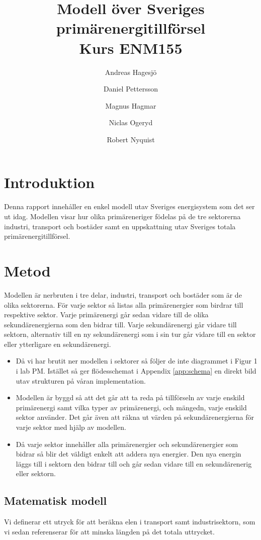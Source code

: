 \documentclass[a4paper,11pt,fleqn, titlepage]{article}
\author{Andreas Hagesjö \and Daniel Pettersson \and
Magnus Hagmar \and Niclas Ogeryd \and Robert Nyquist}
\title{Modell över Sveriges primärenergitillförsel \\ Kurs ENM155}
\begin{document}
\maketitle

\section{Introduktion}
Denna rapport innehåller en enkel modell utav Sveriges energisystem som det
ser ut idag. Modellen visar hur olika primäreneriger födelas på de tre
sektorerna industri, transport och bostäder samt en uppskattning utav
Sveriges totala primärenergitillförsel.


\section{Metod}
Modellen är nerbruten i tre delar, industri, transport och bostäder som är
de olika sektorerna. För varje sektor så listas alla primärenergier som
birdrar till respektive sektor. Varje primärenergi går sedan vidare till de
olika sekundärenergierna som den bidrar till. Varje sekundärenergi går
vidare till sektorn, alternativ till en ny sekundärenergi som i sin tur går
vidare till en sektor eller ytterligare en sekundärenergi.

\begin{itemize}
\item Då vi har brutit ner modellen i sektorer så följer de inte diagrammet
	i Figur 1 i lab PM. Istället så ger flödesschemat i Appendix
	\ref{app:schema} en direkt bild utav strukturen på våran
	implementation.


\item Modellen är byggd så att det går att ta reda på tillförseln av varje
	enskild primärenergi samt vilka typer av primärenergi, och mängedn,
	varje enskild sektor använder. Det går även att räkna ut värden på
	sekundärenergierna för varje sektor med hjälp av modellen.

\item Då varje sektor innehåller alla primärenergier och sekundärenergier
	som bidrar så blir det väldigt enkelt att addera nya energier. Den nya
	energin läggs till i sektorn den bidrar till och går sedan vidare till
	en sekundärenerig eller sektorn.
\end{itemize}

\subsection{Matematisk modell}
Vi definerar ett utryck för att beräkna elen i transport samt
industrisektorn, som vi sedan referenserar för att minska längden på det
totala uttrycket.
\end{document}
